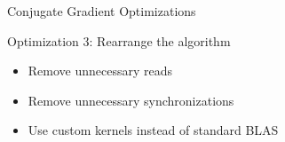 
\begin{frame}[fragile]{Conjugate Gradient Optimizations}

 \begin{block}{Optimization 3: Rearrange the algorithm}
   \begin{itemize}
   \item  Remove unnecessary reads 
   \item  Remove unnecessary synchronizations
   \item Use custom kernels instead of standard BLAS
  \end{itemize}
 \end{block}
   
\end{frame}


